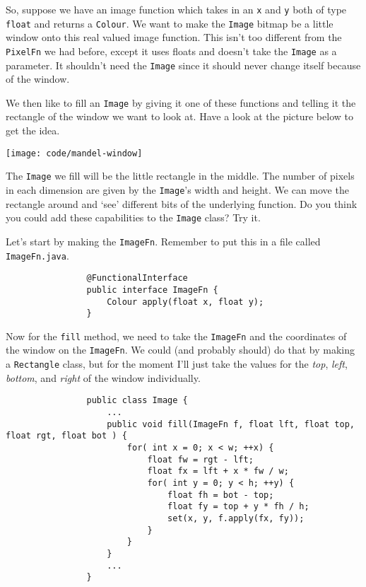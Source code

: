 \documentclass{article}
\begin{document}
            So, suppose we have an image function which takes in an \texttt{x} and \texttt{y} both of type \texttt{float} and returns a
            \texttt{Colour}. We want to make the \texttt{Image} bitmap be a little window onto this real valued image function. This isn't
            too different from the \texttt{PixelFn} we had before, except it uses floats and doesn't take the \texttt{Image} as a
            parameter. It shouldn't need the \texttt{Image} since it should never change itself because of the window.
            
            We then like to fill an \texttt{Image} by giving it one of these functions and telling it the rectangle of the window we want
            to look at.  Have a look at the picture below to get the idea.
            
            \texttt{[image: code/mandel-window]}
            
            The \texttt{Image} we fill will be the little rectangle in the middle. The number of pixels in each dimension are given by the
            \texttt{Image}'s width and height. We can move the rectangle around and `see' different bits of the underlying function.
            Do you think you could add these capabilities to the \texttt{Image} class?  Try it.
            
            
            Let's start by making the \texttt{ImageFn}.  Remember to put this in a file called \texttt{ImageFn.java}.
            
            \begin{verbatim}
                @FunctionalInterface
                public interface ImageFn {
                    Colour apply(float x, float y);
                }
            \end{verbatim}
            
            Now for the \texttt{fill} method, we need to take the \texttt{ImageFn} and the coordinates of the window on the
            \texttt{ImageFn}. We could (and probably should) do that by making a \texttt{Rectangle} class, but for the moment I'll just
            take the values for the \emph{top}, \emph{left}, \emph{bottom}, and \emph{right} of the window individually.
            
            \begin{verbatim}
                public class Image {
                    ...
                    public void fill(ImageFn f, float lft, float top, float rgt, float bot ) {
                        for( int x = 0; x < w; ++x) {
                            float fw = rgt - lft;
                            float fx = lft + x * fw / w;
                            for( int y = 0; y < h; ++y) {
                                float fh = bot - top;
                                float fy = top + y * fh / h;
                                set(x, y, f.apply(fx, fy));
                            }
                        }
                    }                    
                    ...
                }
            \end{verbatim}
            
\end{document}
